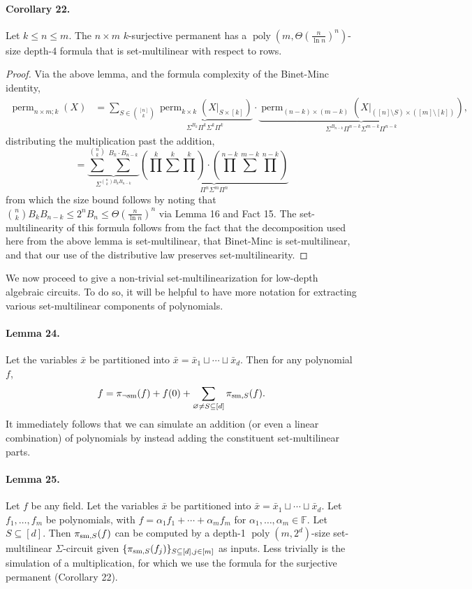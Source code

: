 \documentclass[10pt,a4paper]{article}
\begin{document}
\paragraph{Corollary 22.} Let $k\le n\le m$. The $n\times m$ $k$-surjective permanent has a $\operatorname{poly}(m,\Theta(\frac n{\ln n})^n)$-size depth-4 formula that is set-multilinear with respect to rows.
\begin{proof}
Via the above lemma, and the formula complexity of the Binet-Minc identity,
\begin{align*}
\operatorname{perm}_{n\times m;k}(X)&=\sum_{S\in\binom{[n]}k}\underbrace{\operatorname{perm}_{k\times k}(X|_{S\times[k]})}_{\Sigma^{B_k}\Pi^k\Sigma^k\Pi^k}\cdot\underbrace{\operatorname{perm}_{(n-k)\times(m-k)}(X|_{([n]\setminus S)\times([m]\setminus[k])})}_{\Sigma^{B_{n-k}}\Pi^{n-k}\Sigma^{m-k}\Pi^{n-k}},
\end{align*}
distributing the multiplication past the addition,
\[=\underbrace{\sum^{\binom nk}\sum^{B_k\cdot B_{n-k}}}_{\Sigma^{\binom nk B_k B_{n-k}}}\underbrace{\left(\prod^k\sum^k\prod^k\right)\cdot\left(\prod^{n-k}\sum^{m-k}\prod^{n-k}\right)}_{\Pi^n\Sigma^m\Pi^n}\]
from which the size bound follows by noting that $\binom nk B_k B_{n-k}\le2^n B_n\le\Theta(\frac n{\ln n})^n$ via Lemma 16 and Fact 15.
The set-multilinearity of this formula follows from the fact that the decomposition used here from the above lemma is set-multilinear, that Binet-Minc is set-multilinear, and that our use of the distributive law preserves set-multilinearity.
\end{proof}
We now proceed to give a non-trivial set-multilinearization for low-depth algebraic circuits. To do so, it will be helpful to have more notation for extracting various set-multilinear components of polynomials.
\paragraph{Lemma 24.} Let the variables $\bar x$ be partitioned into $\bar x=\bar x_1\sqcup\cdots\sqcup\bar x_d$. Then for any polynomial $f$,
\[f=\pi_{\neg{\rm sm}}(f)+f(0)+\sum_{\varnothing\ne S\subseteq[d]}\pi_{{\rm sm},S}(f).\]
It immediately follows that we can simulate an addition (or even a linear combination) of polynomials by instead adding the constituent set-multilinear parts.
\paragraph{Lemma 25.} Let $f$ be any field. Let the variables $\bar x$ be partitioned into $\bar x=\bar x_1\sqcup\cdots\sqcup\bar x_d$. Let $f_1,\ldots,f_m$ be polynomials, with $f=\alpha_1f_1+\cdots+\alpha_m f_m$ for $\alpha_1,\ldots,\alpha_m\in\mathbb F$. Let $S\subseteq[d]$. Then $\pi_{{\rm sm},S}(f)$ can be computed by a depth-1 $\operatorname{poly}(m,2^d)$-size set-multilinear $\Sigma$-circuit given $\{\pi_{{\rm sm},S}(f_j)\}_{S\subseteq[d],j\in[m]}$ as inputs.
Less trivially is the simulation of a multiplication, for which we use the formula for the surjective permanent (Corollary 22).
\end{document}
